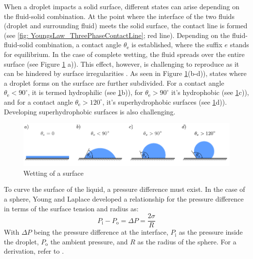 When a droplet impacts a solid surface, different states can arise depending on the fluid-solid combination. At the point where the interface of the two fluids (droplet and surrounding fluid) meets the solid surface, the contact line is formed (see \ref{fig: YoungsLaw_ThreePhaseContactLine}; red line). Depending on the fluid-fluid-solid combination, a contact angle $\theta_{\mathrm{e}}$ is established, where the suffix $e$ stands for equilibrium. In the case of complete wetting, the fluid spreads over the entire surface (see Figure \ref{fig: WettingTheory_WettingOfSurface} a)). This effect, however, is challenging to reproduce as it can be hindered by surface irregularities \cite{buttPhysicsChemistryInterfaces}. As seen in Figure \ref{fig: WettingTheory_WettingOfSurface}(b-d)), states where a droplet forms on the surface are further subdivided. For a contact angle $\theta_{\mathrm{e}}<90^{\circ}$, it is termed hydrophilic (see \ref{fig: WettingTheory_WettingOfSurface}b)), for $\theta_{\mathrm{e}}>90^{\circ}$ it's hydrophobic (see \ref{fig: WettingTheory_WettingOfSurface}c)), and for a contact angle $\theta_{\mathrm{e}}>120^{\circ}$, it's superhydrophobic surfaces (see \ref{fig: WettingTheory_WettingOfSurface}d)). Developing superhydrophobic surfaces is also challenging.
\begin{figure}[h]
    \centering
    \includegraphics[width=.95\textwidth]{Pictures/DropletsAndWetting.pdf}
    \caption{Wetting of a surface}
    \label{fig: WettingTheory_WettingOfSurface}
\end{figure}
To curve the surface of the liquid, a pressure difference must exist. In the case of a sphere, Young and Laplace developed a relationship for the pressure difference in terms of the surface tension and radius as:
\begin{equation}
\label{eq: YoungLaplaceEQ}
    P_{\mathrm{i}} - P_{\mathrm{o}} = \Delta P =  \frac{2\sigma}{R}
\end{equation}
With $\Delta P$ being the pressure difference at the interface, $P_{\mathrm{i}}$ as the pressure inside the droplet, $P_{\mathrm{o}}$ the ambient pressure, and $R$ as the radius of the sphere. For a derivation, refer to \cite{buttPhysicsChemistryInterfaces}.


